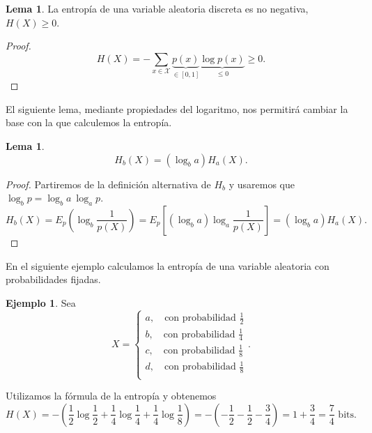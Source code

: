 \documentclass[10pt,a4paper]{article} %
\theoremstyle{definition}
\newtheorem{lemma}[theorem]{Lema}
\newtheorem{example}[theorem]{Ejemplo}
\begin{document}
\begin{lemma} La entropía de una variable aleatoria discreta es no negativa, $H(X) \ge 0$.
\end{lemma}
\begin{proof}
  \[H(X) = - \sum_{x \in \mathcal{X}}\underbrace{p(x)}_{\in [0,1]}\underbrace{\log p(x)}_{\leq 0} \ge 0.\]

\end{proof}

El siguiente lema, mediante propiedades del logaritmo, nos permitirá cambiar la base con la que calculemos la entropía.\\

\begin{lemma}\[H_b(X) = (\log_ba) H_a(X).\]
\end{lemma}
\begin{proof}
  Partiremos de la definición alternativa de $H_b$ y usaremos que $\log_bp = \log_ba\ \log_ap$.
  \[
  H_b(X) = E_p \left(\log_b \frac{1}{p(X)}\right ) = E_p \left [ \left ( \log_b a \right )\log_a \frac{1}{p(X)} \right ] = \left ( \log_b{a} \right ) H_a(X).
  \]
\end{proof}

En el siguiente ejemplo calculamos la entropía de una variable aleatoria con probabilidades fijadas.
\begin{example}
  Sea  \[X = 
     \begin{cases}
       a, \quad\text{con probabilidad } \frac{1}{2}\\
       b, \quad\text{con probabilidad } \frac{1}{4} \\
       c, \quad\text{con probabilidad } \frac{1}{8} \\
       d, \quad\text{con probabilidad } \frac{1}{8} \\
     \end{cases}.\]

     Utilizamos la fórmula de la entropía y obtenemos \[H(X) = - \left (\frac{1}{2} \log \frac{1}{2} + \frac{1}{4} \log \frac{1}{4} + \frac{1}{4} \log \frac{1}{8} \right ) = - \left (-\frac{1}{2} - \frac{1}{2} - \frac{3}{4} \right ) = 1 + \frac{3}{4} = \frac{7}{4} \text{ bits}.\]\\
\end{example}
\end{document}
